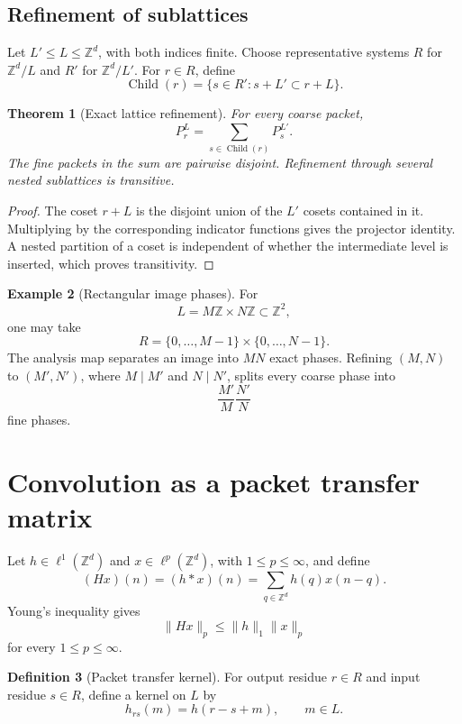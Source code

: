 \documentclass[11pt,a4paper]{article}
\newtheorem{theorem}{Theorem}[section]
\theoremstyle{definition}
\newtheorem{definition}[theorem]{Definition}
\newtheorem{example}[theorem]{Example}
\theoremstyle{remark}
\newcommand{\ZZ}{\mathbb Z}
\begin{document}
\subsection{Refinement of sublattices}

Let \(L'\leq L\leq\ZZ^d\), with both indices finite. Choose representative systems \(R\) for \(\ZZ^d/L\) and \(R'\) for \(\ZZ^d/L'\). For \(r\in R\), define
\[
\operatorname{Child}(r)
=
\{s\in R':s+L'\subset r+L\}.
\]

\begin{theorem}[Exact lattice refinement]\label{thm:lattice_refinement}
For every coarse packet,
\[
P_r^{L}
=
\sum_{s\in\operatorname{Child}(r)}P_s^{L'}.
\]
The fine packets in the sum are pairwise disjoint. Refinement through several nested sublattices is transitive.
\end{theorem}

\begin{proof}
The coset \(r+L\) is the disjoint union of the \(L'\) cosets contained in it. Multiplying by the corresponding indicator functions gives the projector identity. A nested partition of a coset is independent of whether the intermediate level is inserted, which proves transitivity.
\end{proof}

\begin{example}[Rectangular image phases]\label{ex:image_phases}
For
\[
L=M\ZZ\times N\ZZ\subset\ZZ^2,
\]
one may take
\[
R=\{0,\ldots,M-1\}\times\{0,\ldots,N-1\}.
\]
The analysis map separates an image into \(MN\) exact phases. Refining \((M,N)\) to \((M',N')\), where \(M\mid M'\) and \(N\mid N'\), splits every coarse phase into
\[
\frac{M'}M\frac{N'}N
\]
fine phases.
\end{example}

\section{Convolution as a packet transfer matrix}\label{extension:section:04}\label{sec:convolution}

Let \(h\in\ell^1(\ZZ^d)\) and \(x\in\ell^p(\ZZ^d)\), with \(1\leq p\leq\infty\), and define
\[
(Hx)(n)
=(h*x)(n)
=\sum_{q\in\ZZ^d}h(q)x(n-q).
\]
Young's inequality gives
\[
\|Hx\|_p\leq\|h\|_1\|x\|_p
\]
for every \(1\leq p\leq\infty\).

\begin{definition}[Packet transfer kernel]\label{def:packet_transfer_kernel}
For output residue \(r\in R\) and input residue \(s\in R\), define a kernel on \(L\) by
\[
h_{rs}(m)=h(r-s+m),
\qquad
m\in L.
\]
\end{definition}
\end{document}
